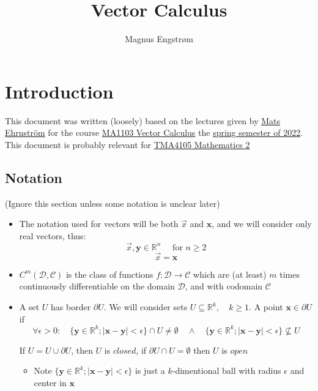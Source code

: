 \documentclass{article}
\title{Vector Calculus}
\author{Magnus Engstrøm}
\theoremstyle{plain}
\begin{document}
\maketitle

\tableofcontents


\section{Introduction}

This document was written (loosely) based on the lectures given by 
\href{https://www.ntnu.no/ansatte/mats.ehrnstrom}{Mats Ehrnström}
for the course \href{https://www.ntnu.edu/studies/courses/MA1103#tab=omEmnet}{MA1103 Vector Calculus}
the \href{https://wiki.math.ntnu.no/ma1103/2022v/start}{spring semester of 2022}. 
This document is probably relevant for \href{https://www.ntnu.edu/studies/courses/TMA4105#tab=omEmnet}{TMA4105 Mathematics 2}

\subsection{Notation}

(Ignore this section unless some notation is unclear later)

\begin{itemize}
    \item The notation used for vectors will be both $\vec{x}$ and $\mathbf x$, and we will consider
    only real vectors, thus:
    $$\vec{x}, \mathbf y \in \mathbb R^n \quad \textrm{ for } n \geq 2$$
    $$\vec{x} = \mathbf x$$

    \item $C^m(\mathcal D, \mathcal C)$ is the class of functions $f: \mathcal D \rightarrow \mathcal C$ which are (at least) $m$ times continuously differentiable
    on the domain $\mathcal D$, and with codomain $\mathcal C$

    \item A set $U$ has border $\partial U$. We will consider sets $U \subseteq \mathbb R^k, \quad k \geq 1$.
    A point $\mathbf x \in \partial U$ if 
    $$\forall \epsilon > 0: \quad \{ \mathbf y \in \mathbb R^k; |\mathbf x - \mathbf y| < \epsilon\} \cap U \neq \emptyset \quad \land \quad \{ \mathbf y \in \mathbb R^k; |\mathbf x - \mathbf y| < \epsilon\} \not \subseteq U$$

    If $U = U \cup \partial U$, then $U$ is $closed$, if $\partial U \cap U = \emptyset$ then $U$ is $open$
    \begin{itemize}
        \item Note $\{ \mathbf y \in \mathbb R^k; |\mathbf x - \mathbf y| < \epsilon\}$ is just a $k$-dimentional ball with radius $\epsilon$ and center in $\mathbf x$
    \end{itemize}
\end{itemize}
\end{document}
